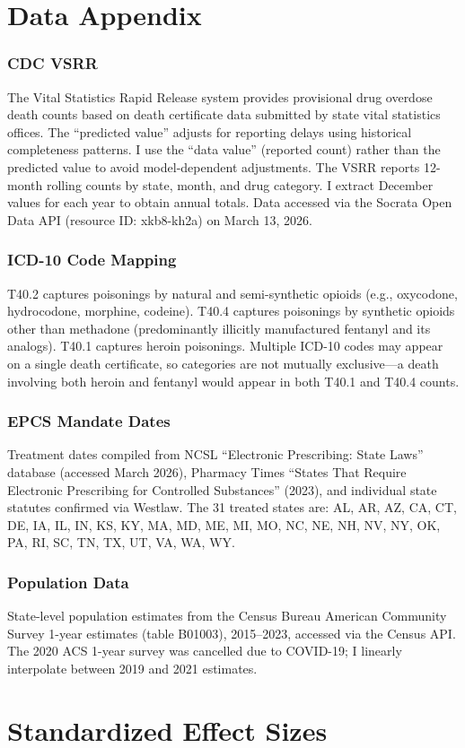 \documentclass[12pt]{article}
\begin{document}
\newpage
\appendix

\section{Data Appendix}

\subsubsection*{CDC VSRR} The Vital Statistics Rapid Release system provides provisional drug overdose death counts based on death certificate data submitted by state vital statistics offices. The ``predicted value'' adjusts for reporting delays using historical completeness patterns. I use the ``data value'' (reported count) rather than the predicted value to avoid model-dependent adjustments. The VSRR reports 12-month rolling counts by state, month, and drug category. I extract December values for each year to obtain annual totals. Data accessed via the Socrata Open Data API (resource ID: xkb8-kh2a) on March 13, 2026.

\subsubsection*{ICD-10 Code Mapping} T40.2 captures poisonings by natural and semi-synthetic opioids (e.g., oxycodone, hydrocodone, morphine, codeine). T40.4 captures poisonings by synthetic opioids other than methadone (predominantly illicitly manufactured fentanyl and its analogs). T40.1 captures heroin poisonings. Multiple ICD-10 codes may appear on a single death certificate, so categories are not mutually exclusive---a death involving both heroin and fentanyl would appear in both T40.1 and T40.4 counts.

\subsubsection*{EPCS Mandate Dates} Treatment dates compiled from NCSL ``Electronic Prescribing: State Laws'' database (accessed March 2026), Pharmacy Times ``States That Require Electronic Prescribing for Controlled Substances'' (2023), and individual state statutes confirmed via Westlaw. The 31 treated states are: AL, AR, AZ, CA, CT, DE, IA, IL, IN, KS, KY, MA, MD, ME, MI, MO, NC, NE, NH, NV, NY, OK, PA, RI, SC, TN, TX, UT, VA, WA, WY.

\subsubsection*{Population Data} State-level population estimates from the Census Bureau American Community Survey 1-year estimates (table B01003), 2015--2023, accessed via the Census API. The 2020 ACS 1-year survey was cancelled due to COVID-19; I linearly interpolate between 2019 and 2021 estimates.

\section{Standardized Effect Sizes}
\label{sec:sde}


\end{document}

